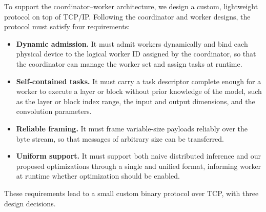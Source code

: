 To support the coordinator--worker architecture, we design a custom, lightweight protocol on top of TCP/IP.
Following the coordinator and worker designs, the protocol must satisfy four requirements:
\begin{itemize}
    \item \textbf{Dynamic admission.} It must admit workers dynamically and bind each physical device to the logical worker ID assigned by the coordinator, so that the coordinator can manage the worker set and assign tasks at runtime.
    \item \textbf{Self-contained tasks.} It must carry a task descriptor complete enough for a worker to execute a layer or block without prior knowledge of the model, such as the layer or block index range, the input and output dimensions, and the convolution parameters.
    \item \textbf{Reliable framing.} It must frame variable-size payloads reliably over the byte stream, so that messages of arbitrary size can be transferred.
    \item \textbf{Uniform support.} It must support both naive distributed
    inference and our proposed optimizations through a single and unified format,
    informing worker at runtime whether optimization should be enabled.
\end{itemize}


These requirements lead to a small custom binary protocol over TCP, with three design decisions.

